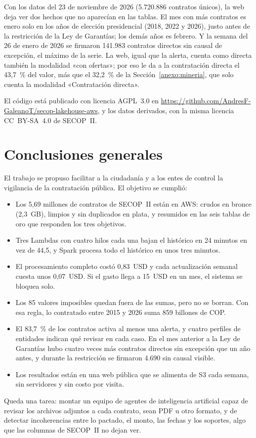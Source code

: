 \documentclass[conference,letterpaper]{IEEEtran}
\begin{document}
Con los datos del 23 de noviembre de 2026 (5.720.886 contratos únicos), la web deja ver dos hechos que no
aparecían en las tablas. El mes con más contratos es enero solo en los años de elección presidencial (2018,
2022 y 2026), justo antes de la restricción de la Ley de Garantías; los demás años es febrero. Y la semana
del 26 de enero de 2026 se firmaron 141.983 contratos directos sin causal de excepción, el máximo de la
serie. La web, igual que la alerta, cuenta como directa también la modalidad «con ofertas»; por eso le da a
la contratación directa el 43,7~\% del valor, más que el 32,2~\% de la Sección~\ref{anexo:mineria}, que solo
cuenta la modalidad «Contratación directa».

El código está publicado con licencia AGPL~3.0 en
\url{https://github.com/AndresF-GaleanoT/secop-lakehouse-aws}, y los datos derivados, con la misma licencia
CC~BY-SA~4.0 de SECOP~II.

\section{Conclusiones generales}
El trabajo se propuso facilitar a la ciudadanía y a los entes de control la vigilancia de la contratación pública. El objetivo se cumplió:
\begin{itemize}[leftmargin=*]
  \item Los 5,69 millones de contratos de SECOP~II están en AWS: crudos en bronce (2,3~GB), limpios y sin
        duplicados en plata, y resumidos en las seis tablas de oro que responden los tres objetivos.
  \item Tres Lambdas con cuatro hilos cada una bajan el histórico en 24 minutos en vez de 44,5, y Spark procesa
        todo el histórico en unos tres minutos.
  \item El procesamiento completo costó 0,83~USD y cada actualización semanal cuesta unos 0,07~USD. Si el gasto
        llega a 15~USD en un mes, el sistema se bloquea solo.
  \item Los 85 valores imposibles quedan fuera de las sumas, pero no se borran. Con esa regla, lo
        contratado entre 2015 y 2026 suma 859 billones de COP.
  \item El 83,7~\% de los contratos activa al menos una alerta, y cuatro perfiles de entidades indican qué
        revisar en cada caso. En el mes anterior a la Ley de Garantías hubo cuatro veces más contratos
        directos sin excepción que un año antes, y durante la restricción se firmaron 4.690 sin causal
        visible.
  \item Los resultados están en una web pública que se alimenta de S3 cada semana, sin servidores y sin
        costo por visita.
\end{itemize}

Queda una tarea: montar un equipo de agentes de inteligencia
artificial capaz de revisar los archivos adjuntos a cada contrato, sean PDF u otro formato, y de detectar
incoherencias entre lo pactado, el monto, las fechas y los soportes, algo que las columnas de SECOP~II no dejan ver.


\end{document}
